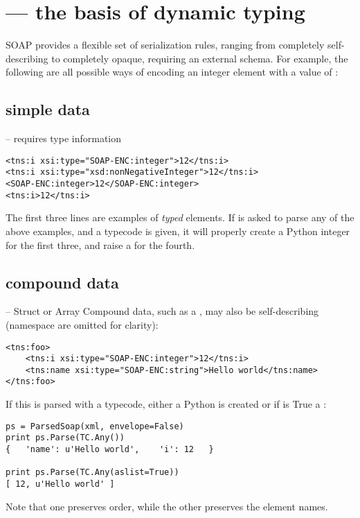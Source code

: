 \section{ --- the basis of dynamic typing}

SOAP provides a flexible set of serialization rules, ranging from
completely self-describing to completely opaque, requiring an external
schema. For example, the following are all possible ways of encoding an
integer element  with a value of :

\subsection{simple data} -- requires type information
\begin{verbatim}
<tns:i xsi:type="SOAP-ENC:integer">12</tns:i>
<tns:i xsi:type="xsd:nonNegativeInteger">12</tns:i>
<SOAP-ENC:integer>12</SOAP-ENC:integer>
<tns:i>12</tns:i>
\end{verbatim}

The first three lines are examples of \emph{typed} elements.
If \ZSI{} is asked to parse any of the above examples, and a
 typecode is given, it will properly create a Python
integer for the first three, and raise a 
for the fourth.

\subsection{compound data} -- Struct or Array
Compound data, such as a , may also be self-describing (namespace
are omitted for clarity):
\begin{verbatim}
<tns:foo>
    <tns:i xsi:type="SOAP-ENC:integer">12</tns:i>
    <tns:name xsi:type="SOAP-ENC:string">Hello world</tns:name>
</tns:foo>
\end{verbatim}

If this is parsed with a  typecode, either a Python 
is created or if  is True a :
\begin{verbatim}
ps = ParsedSoap(xml, envelope=False)
print ps.Parse(TC.Any())
{   'name': u'Hello world',    'i': 12   }

print ps.Parse(TC.Any(aslist=True))
[ 12, u'Hello world' ]
\end{verbatim}
Note that one preserves order, while the other preserves the element names.


